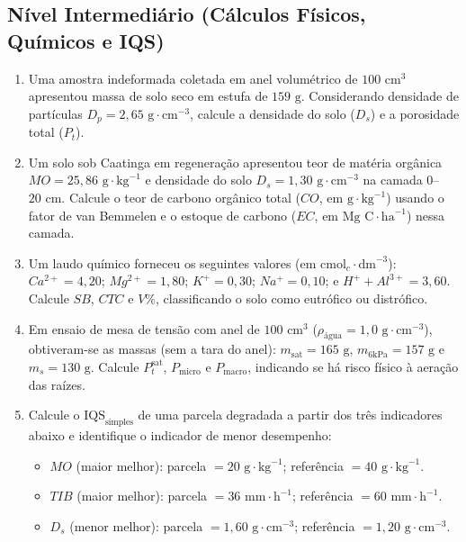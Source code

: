 \subsection*{Nível Intermediário (Cálculos Físicos, Químicos e IQS)}

\begin{enumerate}[leftmargin=1.8em, itemsep=6pt, resume]
  \item Uma amostra indeformada coletada em anel volumétrico de $100\text{ cm}^3$ apresentou massa de solo seco em estufa de $159\text{ g}$. Considerando densidade de partículas $D_p = 2{,}65\text{ g}\cdot\text{cm}^{-3}$, calcule a densidade do solo ($D_s$) e a porosidade total ($P_t$).
  \espacoResolucao[2.2cm]

  \item Um solo sob Caatinga em regeneração apresentou teor de matéria orgânica $MO = 25{,}86\text{ g}\cdot\text{kg}^{-1}$ e densidade do solo $D_s = 1{,}30\text{ g}\cdot\text{cm}^{-3}$ na camada $0$--$20\text{ cm}$. Calcule o teor de carbono orgânico total ($CO$, em $\text{g}\cdot\text{kg}^{-1}$) usando o fator de van Bemmelen e o estoque de carbono ($EC$, em $\text{Mg C}\cdot\text{ha}^{-1}$) nessa camada.
  \espacoResolucao[2.2cm]

  \item Um laudo químico forneceu os seguintes valores (em $\text{cmol}_c\cdot\text{dm}^{-3}$): $Ca^{2+} = 4{,}20$; $Mg^{2+} = 1{,}80$; $K^+ = 0{,}30$; $Na^+ = 0{,}10$; e $H^+ + Al^{3+} = 3{,}60$. Calcule $SB$, $CTC$ e $V\%$, classificando o solo como eutrófico ou distrófico.
  \espacoResolucao[2.2cm]

  \item Em ensaio de mesa de tensão com anel de $100\text{ cm}^3$ ($\rho_{\text{água}} = 1{,}0\text{ g}\cdot\text{cm}^{-3}$), obtiveram-se as massas (sem a tara do anel): $m_{\text{sat}} = 165\text{ g}$, $m_{6\text{kPa}} = 157\text{ g}$ e $m_s = 130\text{ g}$. Calcule $P_t^{\text{sat}}$, $P_{\text{micro}}$ e $P_{\text{macro}}$, indicando se há risco físico à aeração das raízes.
  \espacoResolucao[2.2cm]

  \item Calcule o $\text{IQS}_{\text{simples}}$ de uma parcela degradada a partir dos três indicadores abaixo e identifique o indicador de menor desempenho:
  \begin{itemize}[leftmargin=1.4em, itemsep=1pt]
    \item $MO$ (maior melhor): parcela $= 20\text{ g}\cdot\text{kg}^{-1}$; referência $= 40\text{ g}\cdot\text{kg}^{-1}$.
    \item $TIB$ (maior melhor): parcela $= 36\text{ mm}\cdot\text{h}^{-1}$; referência $= 60\text{ mm}\cdot\text{h}^{-1}$.
    \item $D_s$ (menor melhor): parcela $= 1{,}60\text{ g}\cdot\text{cm}^{-3}$; referência $= 1{,}20\text{ g}\cdot\text{cm}^{-3}$.
  \end{itemize}
  \espacoResolucao[2.2cm]
\end{enumerate}

